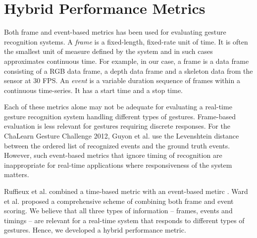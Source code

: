 \chapter{Hybrid Performance Metrics}
Both frame \cite{song12} and event-based \cite{guyon13} metrics has been
used for evaluating gesture recognition systems. A \textit{frame} is a
fixed-length, fixed-rate unit of time. It is often the smallest unit of measure
defined by the system \cite{ward11} and in such cases approximates continuous
time.
For example, in our case, a frame is a data frame consisting of a RGB data frame, a depth data frame and a skeleton data from the
sensor at 30 FPS. An \textit{event} is a variable duration sequence of frames
within a continuous time-series.  It has a start time and a stop time.

Each of these metrics alone may not be adequate for evaluating a real-time
gesture recognition system handling different types of gestures. Frame-based
evaluation is less relevant for gestures requiring discrete responses. For the ChaLearn Gesture Challenge 2012, Guyon et al.
\cite{guyon13} use the Levenshtein distance between the ordered list of
recognized events and the ground truth events. However, such event-based metrics
that ignore timing of recognition are inappropriate for real-time
applications where responsiveness of the system matters.

Ruffieux et al. combined a time-based metric with an event-based metirc
\cite{Ruffieux2013}. Ward et al. \cite{ward11} proposed a comprehensive
scheme of combining both frame and event scoring.
We believe that all three types of information -- frames, events and
timings -- are relevant for a real-time system that responds to different types
of gestures. Hence, we developed a hybrid performance metric.

